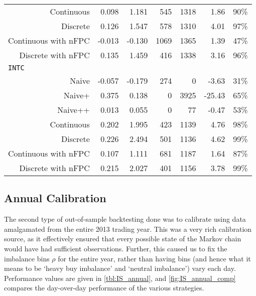 \begin{table}
\begin{tabular}{@{} *{7}{r} @{}}
Continuous & 0.098 & 1.181 & 545 & 1318 & 1.86 & 90\% \\
Discrete & 0.126 & 1.547 & 578 & 1310 & 4.01 & 97\% \\
Continuous with nFPC & -0.013 & -0.130 & 1069 & 1365 & 1.39 & 47\% \\
Discrete with nFPC & 0.135 & 1.459 & 416 & 1338 & 3.16 & 96\% \\[2ex]
\multicolumn{7}{l}{\texttt{INTC}} \\ 
Naive & -0.057 & -0.179 & 274 & 0 & -3.63 & 31\% \\
Naive+ & 0.375 & 0.138 & 0 & 3925 & -25.43 & 65\% \\
Naive++ & 0.013 & 0.055 & 0 & 77 & -0.47 & 53\% \\
Continuous & 0.202 & 1.995 & 423 & 1139 & 4.76 & 98\% \\
Discrete & 0.226 & 2.494 & 501 & 1136 & 4.62 & 99\% \\
Continuous with nFPC & 0.107 & 1.111 & 681 & 1187 & 1.64 & 87\% \\
Discrete with nFPC & 0.215 & 2.027 & 401 & 1156 & 3.78 & 99\% \\
\bottomrule
\end{tabular}
\end{table}

\FloatBarrier
\subsection{Annual Calibration}
The second type of out-of-sample backtesting done was to calibrate using data amalgamated from the entire 2013 trading year. This was a very rich calibration source, as it effectively ensured that every possible state of the Markov chain would have had sufficient observations. Further, this caused us to fix the imbalance bins $\rho$ for the entire year, rather than having bins (and hence what it means to be `heavy buy imbalance' and `neutral imbalance') vary each day. Performance values are given in \autoref{tbl:IS_annual}, and \autoref{fig:IS_annual_comp} compares the day-over-day performance of the various strategies. 

